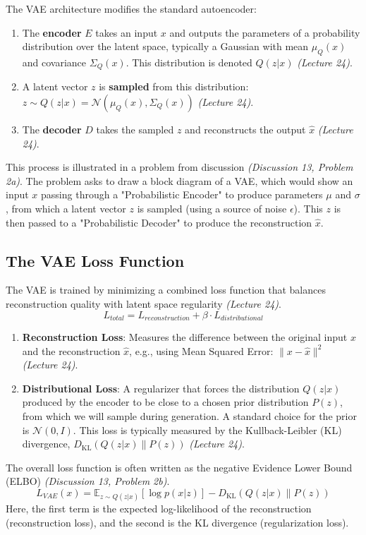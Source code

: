 \documentclass[11pt]{article}
\newcommand{\E}{\mathbb{E}}
\newcommand{\KL}{\text{KL}}
\begin{document}
The VAE architecture modifies the standard autoencoder:
\begin{enumerate}
    \item The \textbf{encoder} $E$ takes an input $x$ and outputs the parameters of a probability distribution over the latent space, typically a Gaussian with mean $\mu_Q(x)$ and covariance $\Sigma_Q(x)$. This distribution is denoted $Q(z|x)$ \textit{(Lecture 24)}.
    \item A latent vector $z$ is \textbf{sampled} from this distribution: $z \sim Q(z|x) = \mathcal{N}(\mu_Q(x), \Sigma_Q(x))$ \textit{(Lecture 24)}.
    \item The \textbf{decoder} $D$ takes the sampled $z$ and reconstructs the output $\hat{x}$ \textit{(Lecture 24)}.
\end{enumerate}
This process is illustrated in a problem from discussion \textit{(Discussion 13, Problem 2a)}. The problem asks to draw a block diagram of a VAE, which would show an input $x$ passing through a "Probabilistic Encoder" to produce parameters $\mu$ and $\sigma$, from which a latent vector $z$ is sampled (using a source of noise $\epsilon$). This $z$ is then passed to a "Probabilistic Decoder" to produce the reconstruction $\hat{x}$.

\subsection{The VAE Loss Function}
The VAE is trained by minimizing a combined loss function that balances reconstruction quality with latent space regularity \textit{(Lecture 24)}.
\[ L_{total} = L_{reconstruction} + \beta \cdot L_{distributional} \]
\begin{enumerate}
    \item \textbf{Reconstruction Loss}: Measures the difference between the original input $x$ and the reconstruction $\hat{x}$, e.g., using Mean Squared Error: $\|x - \hat{x}\|^2$ \textit{(Lecture 24)}.
    \item \textbf{Distributional Loss}: A regularizer that forces the distribution $Q(z|x)$ produced by the encoder to be close to a chosen prior distribution $P(z)$, from which we will sample during generation. A standard choice for the prior is $\mathcal{N}(0, I)$. This loss is typically measured by the Kullback-Leibler (KL) divergence, $D_{\KL}(Q(z|x) \| P(z))$ \textit{(Lecture 24)}.
\end{enumerate}
The overall loss function is often written as the negative Evidence Lower Bound (ELBO) \textit{(Discussion 13, Problem 2b)}.
\[ L_{VAE}(x) = \E_{z \sim Q(z|x)}[\log p(x|z)] - D_{\KL}(Q(z|x) \| P(z)) \]
Here, the first term is the expected log-likelihood of the reconstruction (reconstruction loss), and the second is the KL divergence (regularization loss).
\end{document}
